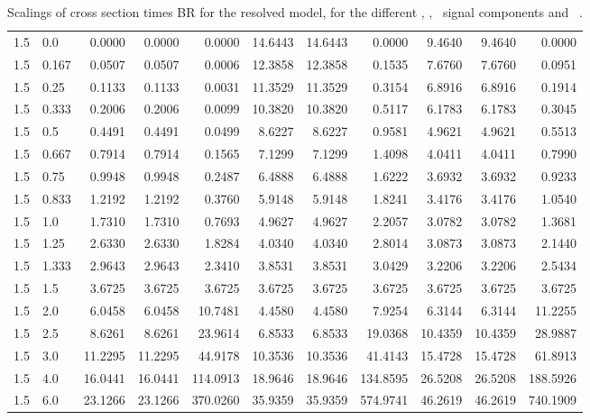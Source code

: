 \begin{table}[h!]
\begin{tabular}{ll rrr rrr rrr}
   1.5 & 0.0    & 0.0000 & 0.0000 & 0.0000   & 14.6443 & 14.6443 & 0.0000 & 9.4640 & 9.4640 & 0.0000 \\
   1.5 & 0.167  & 0.0507 & 0.0507 & 0.0006   & 12.3858 & 12.3858 & 0.1535 & 7.6760 & 7.6760 & 0.0951 \\
   1.5 & 0.25   & 0.1133 & 0.1133 & 0.0031   & 11.3529 & 11.3529 & 0.3154 & 6.8916 & 6.8916 & 0.1914 \\
   1.5 & 0.333  & 0.2006 & 0.2006 & 0.0099   & 10.3820 & 10.3820 & 0.5117 & 6.1783 & 6.1783 & 0.3045 \\
   1.5 & 0.5    & 0.4491 & 0.4491 & 0.0499   & 8.6227 & 8.6227 & 0.9581 & 4.9621 & 4.9621 & 0.5513 \\
   1.5 & 0.667  & 0.7914 & 0.7914 & 0.1565   & 7.1299 & 7.1299 & 1.4098 & 4.0411 & 4.0411 & 0.7990 \\
   1.5 & 0.75   & 0.9948 & 0.9948 & 0.2487   & 6.4888 & 6.4888 & 1.6222 & 3.6932 & 3.6932 & 0.9233 \\
   1.5 & 0.833  & 1.2192 & 1.2192 & 0.3760   & 5.9148 & 5.9148 & 1.8241 & 3.4176 & 3.4176 & 1.0540 \\
   1.5 & 1.0    & 1.7310 & 1.7310 & 0.7693   & 4.9627 & 4.9627 & 2.2057 & 3.0782 & 3.0782 & 1.3681 \\
   1.5 & 1.25   & 2.6330 & 2.6330 & 1.8284   & 4.0340 & 4.0340 & 2.8014 & 3.0873 & 3.0873 & 2.1440 \\
   1.5 & 1.333  & 2.9643 & 2.9643 & 2.3410   & 3.8531 & 3.8531 & 3.0429 & 3.2206 & 3.2206 & 2.5434 \\
   1.5 & 1.5    & 3.6725 & 3.6725 & 3.6725   & 3.6725 & 3.6725 & 3.6725 & 3.6725 & 3.6725 & 3.6725 \\
   1.5 & 2.0    & 6.0458 & 6.0458 & 10.7481  & 4.4580 & 4.4580 & 7.9254 & 6.3144 & 6.3144 & 11.2255 \\
   1.5 & 2.5    & 8.6261 & 8.6261 & 23.9614  & 6.8533 & 6.8533 & 19.0368 & 10.4359 & 10.4359 & 28.9887 \\
   1.5 & 3.0    & 11.2295 & 11.2295 & 44.9178 & 10.3536 & 10.3536 & 41.4143 & 15.4728 & 15.4728 & 61.8913 \\
   1.5 & 4.0    & 16.0441 & 16.0441 & 114.0913 & 18.9646 & 18.9646 & 134.8595 & 26.5208 & 26.5208 & 188.5926 \\
   1.5 & 6.0    & 23.1266 & 23.1266 & 370.0260 & 35.9359 & 35.9359 & 574.9741 & 46.2619 & 46.2619 & 740.1909 \\\hline
    \end{tabular}                                                                                                                                                                          
    \caption{Scalings of cross section times BR for the resolved model, for the different \ttH, \tHq, \tHW\ signal components and \ .}\label{tab:xsbrscalingK6_1p5}                              
 \end{table}   
